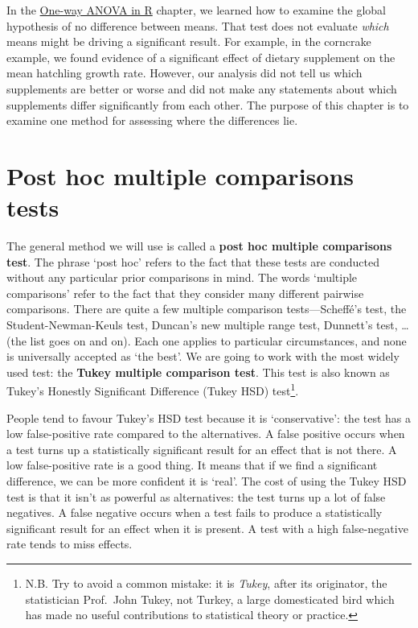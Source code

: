 \documentclass[
]{book}
\begin{document}
In the \protect\hyperlink{one-way-anova-in-R}{One-way ANOVA in R} chapter, we learned how to examine the global hypothesis of no difference between means. That test does not evaluate \emph{which} means might be driving a significant result. For example, in the corncrake example, we found evidence of a significant effect of dietary supplement on the mean hatchling growth rate. However, our analysis did not tell us which supplements are better or worse and did not make any statements about which supplements differ significantly from each other. The purpose of this chapter is to examine one method for assessing where the differences lie.

\hypertarget{post-hoc-multiple-comparisons-tests}{%
\section{Post hoc multiple comparisons tests}\label{post-hoc-multiple-comparisons-tests}}

The general method we will use is called a \textbf{post hoc multiple comparisons test}. The phrase `post hoc' refers to the fact that these tests are conducted without any particular prior comparisons in mind. The words `multiple comparisons' refer to the fact that they consider many different pairwise comparisons. There are quite a few multiple comparison tests---Scheffé's test, the Student-Newman-Keuls test, Duncan's new multiple range test, Dunnett's test, \ldots{} (the list goes on and on). Each one applies to particular circumstances, and none is universally accepted as `the best'. We are going to work with the most widely used test: the \textbf{Tukey multiple comparison test}. This test is also known as Tukey's Honestly Significant Difference (Tukey HSD) test\footnote{N.B. Try to avoid a common mistake: it is \emph{Tukey}, after its originator, the statistician Prof.~John Tukey, not Turkey, a large domesticated bird which has made no useful contributions to statistical theory or practice.}.

People tend to favour Tukey's HSD test because it is `conservative': the test has a low false-positive rate compared to the alternatives. A false positive occurs when a test turns up a statistically significant result for an effect that is not there. A low false-positive rate is a good thing. It means that if we find a significant difference, we can be more confident it is `real'. The cost of using the Tukey HSD test is that it isn't as powerful as alternatives: the test turns up a lot of false negatives. A false negative occurs when a test fails to produce a statistically significant result for an effect when it is present. A test with a high false-negative rate tends to miss effects.
\end{document}
